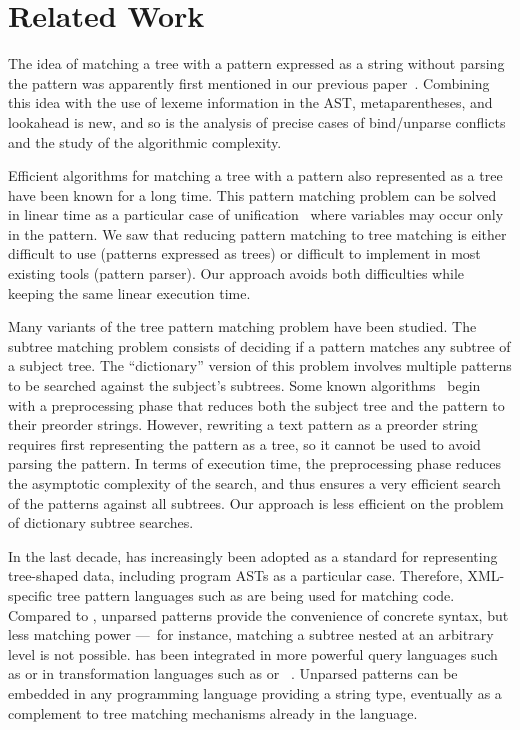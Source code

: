 
\section{Related Work}
\label{related_work}

The idea of matching a tree with a pattern expressed as a string
without parsing the pattern was apparently first mentioned in our
previous paper~\cite{ppdp}. Combining this idea with the use of lexeme
information in the AST, meta\-parentheses, and lookahead is new, and
so is the analysis of precise cases of bind/\-unparse conflicts and
the study of the algorithmic complexity.

Efficient algorithms for matching a tree with a pattern also
represented as a tree have been known for a long time. This pattern
matching problem can be solved in linear time as a particular case of
unification~\cite{unification} where variables may occur only in the
pattern. We saw that reducing pattern matching to tree matching is
either difficult to use (patterns expressed as trees) or difficult to
implement in most existing tools (pattern parser). Our approach avoids
both difficulties while keeping the same linear execution time.

Many variants of the tree pattern matching problem have been
studied. The subtree matching problem consists of deciding if a
pattern matches any subtree of a subject tree. The ``dictionary''
version of this problem involves multiple patterns to be searched
against the subject's subtrees. Some known algorithms~\cite{rooted}
begin with a pre\-processing phase that reduces both the subject tree
and the pattern to their pre\-order strings. However, re\-writing a
text pattern as a pre\-order string requires first representing the
pattern as a tree, so it cannot be used to avoid parsing the
pattern. In terms of execution time, the preprocessing phase reduces
the asymptotic complexity of the search, and thus ensures a very
efficient search of the patterns against all subtrees. Our approach is
less efficient on the problem of dictionary subtree searches.

In the last decade, \XML has increasingly been adopted as a standard
for representing tree\hyp{}shaped data, including program ASTs as a
particular case. Therefore, \textsf{XML}\hyp{}specific tree pattern 
languages such as \XPath are being used for matching code. Compared to
\XPath, unparsed patterns provide the convenience of concrete syntax,
but less matching power ---~for instance, matching a subtree nested at
an arbitrary level is not possible. \XPath has been integrated in more
powerful query languages such as \XQuery or in transformation
languages such as \XSLT or \CDuce~\cite{cduce}. Unparsed patterns can
be embedded in any programming language providing a string type,
eventually as a complement to tree matching mechanisms already in the
language.

